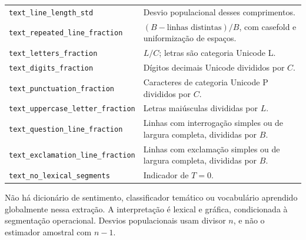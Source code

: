 \begin{longtable}{>{\raggedright\arraybackslash}p{}>{\raggedright\arraybackslash}p{}}
\texttt{text\_line\_length\_std} & Desvio populacional desses comprimentos.\\
\texttt{text\_repeated\_line\_fraction} & $(B-\text{linhas distintas})/B$, com casefold e uniformização de espaços.\\
\texttt{text\_letters\_fraction} & $L/C$; letras são categoria Unicode L.\\
\texttt{text\_digits\_fraction} & Dígitos decimais Unicode divididos por $C$.\\
\texttt{text\_punctuation\_fraction} & Caracteres de categoria Unicode P divididos por $C$.\\
\texttt{text\_uppercase\_letter\_fraction} & Letras maiúsculas divididas por $L$.\\
\texttt{text\_question\_line\_fraction} & Linhas com interrogação simples ou de largura completa, divididas por $B$.\\
\texttt{text\_exclamation\_line\_fraction} & Linhas com exclamação simples ou de largura completa, divididas por $B$.\\
\texttt{text\_no\_lexical\_segments} & Indicador de $T=0$.\\
\end{longtable}
\endgroup
Não há dicionário de sentimento, classificador temático ou vocabulário aprendido globalmente nessa extração. A interpretação é lexical e gráfica, condicionada à segmentação operacional. Desvios populacionais usam divisor $n$, e não o estimador amostral com $n-1$.
